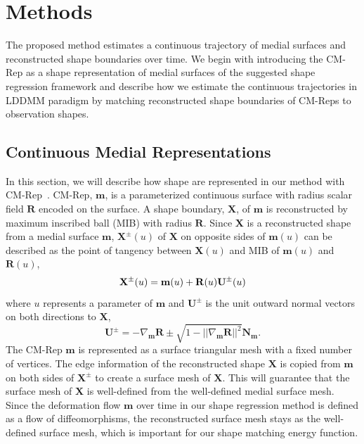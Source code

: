 \documentclass{llncs}
\begin{document}
\section{Methods}

The proposed method estimates a continuous trajectory of medial surfaces and reconstructed shape boundaries over time. 
We begin with introducing the CM-Rep as a shape representation of medial surfaces of the suggested shape regression framework and describe how we estimate the continuous trajectories in LDDMM paradigm by matching reconstructed shape boundaries of CM-Reps to observation shapes. 

\subsection{Continuous Medial Representations}
\label{ssec:CMRep}

In this section, we will describe how shape are represented in our method with CM-Rep~\cite{Yushkevich2009}. 
CM-Rep, $\mathbf{m}$, is a parameterized continuous surface with radius scalar field $\mathbf{R}$ encoded on the surface. 
A shape boundary, $\mathbf{X}$, of $\mathbf{m}$ is reconstructed by maximum inscribed ball (MIB) with radius $\mathbf{R}$. 
Since $\mathbf{X}$ is a reconstructed shape from a medial surface $\mathbf{m}$, $\mathbf{X}^{\pm}(u)$ of $\mathbf{X}$ on opposite sides of $\mathbf{m}(u)$ 
can be described as the point of tangency between $\mathbf{X}(u)$ and MIB of $\mathbf{m}(u)$ and $\mathbf{R}(u)$, 
\begin{equation}
 \mathbf{X}^{\pm}(u) = \mathbf{m}(u) + \mathbf{R}(u)\mathbf{U}^{\pm}(u) \\
\end{equation}
where $u$ represents a parameter of $\mathbf{m}$ and $\mathbf{U}^{\pm}$ is the unit outward normal vectors on both directions to $\mathbf{X}$,
\begin{equation}
 \mathbf{U}^{\pm} = -\nabla_\mathbf{m} \mathbf{R} \pm \sqrt{ 1 - || \nabla_\mathbf{m} \mathbf{R} ||^2 }\mathbf{N}_\mathbf{m}.
\end{equation}
The CM-Rep $\mathbf{m}$ is represented as a surface triangular mesh with a fixed number of vertices. 
The edge information of the reconstructed shape $\mathbf{X}$ is copied from $\mathbf{m}$ on both sides of $\mathbf{X}^\pm$ to create a surface mesh of $\mathbf{X}$. 
This will guarantee that the surface mesh of $\mathbf{X}$ is well-defined from the well-defined medial surface mesh. 
Since the deformation flow $\mathbf{m}$ over time in our shape regression method is defined as a flow of diffeomorphisms, the reconstructed surface mesh stays as the well-defined surface mesh, which is important for our shape matching energy function. 
\end{document}
